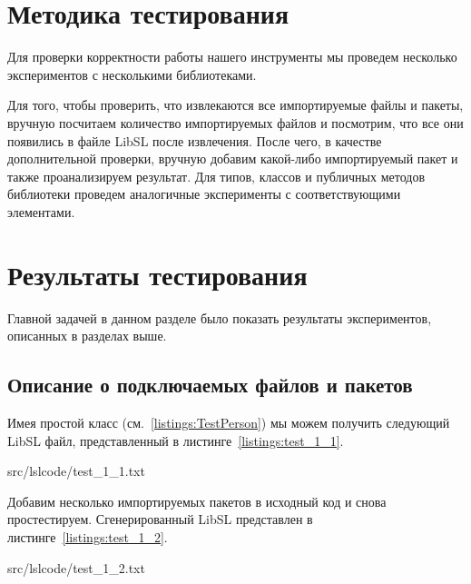 \section{Методика тестирования}

Для проверки корректности работы нашего инструменты мы проведем несколько экспериментов с несколькими библиотеками.

Для того, чтобы проверить, что извлекаются все импортируемые файлы и пакеты, вручную посчитаем количество импортируемых файлов и посмотрим, что все они появились в файле LibSL после извлечения.
После чего, в качестве дополнительной проверки, вручную добавим какой-либо импортируемый пакет и также проанализируем результат.
Для типов, классов и публичных методов библиотеки проведем аналогичные эксперименты с соответствующими элементами.

\section{Результаты тестирования}

Главной задачей в данном разделе было показать результаты экспериментов, описанных в разделах выше.

\subsection{Описание о подключаемых файлов и пакетов}

Имея простой класс (см.~\ref{listings:TestPerson}) мы можем получить следующий LibSL файл, представленный в листинге~\ref{listings:test_1_1}.

{src/lslcode/test_1_1.txt}

Добавим несколько импортируемых пакетов в исходный код и снова простестируем. Сгенерированный LibSL представлен в листинге~\ref{listings:test_1_2}.

{src/lslcode/test_1_2.txt}

